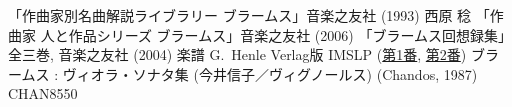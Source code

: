 
\begin{thebibliography}{99}
	 「作曲家別名曲解説ライブラリー ブラームス」音楽之友社 (1993)
	 西原 稔 「作曲家 人と作品シリーズ ブラームス」音楽之友社 (2006)
	 「ブラームス回想録集」全三巻, 音楽之友社 (2004)
	 楽譜 G.~Henle Verlag版
	 IMSLP (\href{http://imslp.org/wiki/Clarinet_Sonata_No.1,_Op.120_No.1_(Brahms,_Johannes)}{第1番},
		\href{http://imslp.org/wiki/Clarinet_Sonata_No.2,_Op.120_No.2_(Brahms,_Johannes)}{第2番})
	 ブラームス : ヴィオラ・ソナタ集 (今井信子／ヴィグノールス) (Chandos, 1987) CHAN8550
\end{thebibliography}
